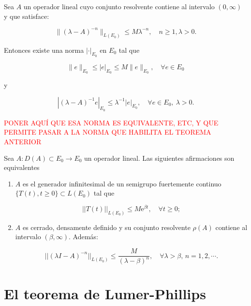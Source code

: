 \begin{Lema}
    \label{ch:semigrupos:lemma:existeNorma}
    Sea $A$ un operador lineal cuyo conjunto resolvente contiene al intervalo $(0, \infty)$ y que satisface:

    \[\lVert (\lambda - A)^{-n} \rVert_{L(E_0)} \leq M \lambda^{-n}, \quad n \geq 1, \lambda > 0.\]

    Entonces existe una norma $|\cdot|_{E_0}$ en $E_0$ tal que

    \[\lVert e \rVert_{E_0} \leq |e|_{E_0} \leq M \lVert e \rVert_{E_0}, \quad \forall e \in E_0\]

    y

    \[| (\lambda - A)^{-1}e |_{E_0} \leq \lambda^{-1}|e|_{E_0}, \quad \forall e \in E_0, \ \lambda > 0.\]
\end{Lema}

\textcolor{red}{PONER AQUÍ QUE ESA NORMA ES EQUIVALENTE, ETC, Y QUE PERMITE PASAR A LA NORMA QUE HABILITA EL TEOREMA ANTERIOR}\\

\begin{Teorema}
    \label{ch:semigrupos:th:HilleYosidaGeneral}
    Sea $A : D(A) \subset E_0 \rightarrow E_0$ un operador lineal. Las siguientes afirmaciones son equivalentes

    \begin{enumerate}
        \item $A$ es el generador infinitesimal de un semigrupo fuertemente continuo $\{T(t), t \geq 0\} \subset L(E_0)$ tal que

        \[||T(t)||_{L(E_0)} \leq M\mathrm{e}^{\beta t}, \quad \forall t \geq 0;\]

        \item $A$ es cerrado, densamente definido y su conjunto resolvente $\rho(A)$ contiene al intervalo $(\beta, \infty)$. Además:

        \[||(\lambda I - A)^{-n}||_{L(E_0)} \leq \frac{M}{(\lambda - \beta)^n}, \quad \forall \lambda > \beta, \, n = 1,2,\cdots .\]
    \end{enumerate}
\end{Teorema}

\section{El teorema de Lumer-Phillips}
\label{ch:semigrupos:section:LumerPhillips}

